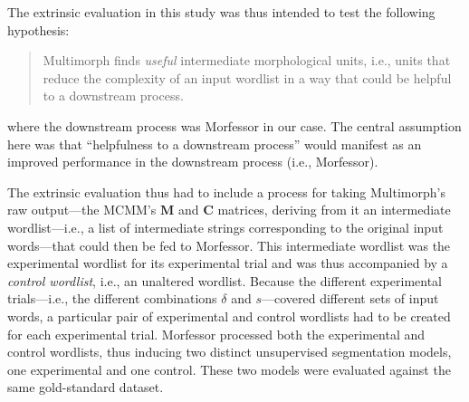 {%
The extrinsic evaluation in this study was thus intended to test the following hypothesis:
\begin{quotation}\noindent
Multimorph finds \emph{useful} intermediate morphological units, i.e., units that reduce the
complexity of an input wordlist in a way that could be helpful to a downstream process.
\end{quotation}
where the downstream process was Morfessor in our case.
The central assumption here was that ``helpfulness to a downstream process''  would manifest as an improved performance in the downstream process (i.e., Morfessor). %

The extrinsic evaluation thus had to include a process for taking Multimorph's raw output---the MCMM's
$\textbf{M}$ and $\textbf{C}$ matrices, deriving from it an intermediate wordlist---i.e.,
a list of intermediate strings corresponding to the original input words---that could %
then be fed to Morfessor. 
This intermediate wordlist was the experimental wordlist for its experimental trial
and was thus accompanied by a \emph{control wordlist}, i.e., an unaltered wordlist.
Because the different experimental trials---i.e., 
the different combinations $\delta$ and $s$---covered
different sets of input words, a particular pair of experimental and control wordlists had to be created for each
experimental trial.
Morfessor processed both the experimental and control wordlists, 
thus inducing two distinct unsupervised segmentation 
models, one experimental and one control. 
These two models were evaluated
against the same gold-standard dataset. 


}
